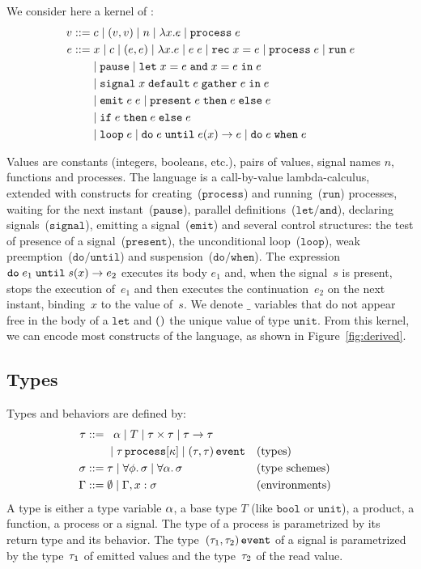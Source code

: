 \documentclass[9pt,preprint]{sigplanconf}
\newcommand{\sdeq}{::=}
\begin{document}
We consider here a kernel of \rml{}:
%
\begin{align*}
v \sdeq &\; c \mid (v, v) \mid n \mid \elam{x}{e} \mid \eproc{e} \\
e \sdeq &\;  x \mid c \mid (e, e) \mid \elam{x}{e} 
  \mid \eapp{e}{e} \mid \erec{x}{e}  \mid \eproc{e} \mid \erun{e} \\
 & \mid \epause{} \mid \eletpar{x}{e}{x}{e}{e} \\
 &\mid \esig{x}{e}{e}{e} \\
 & \mid \eemit{e}{e} \mid \epres{e}{e}{e} \\
 & \mid \eite{e}{e}{e} \\
 &  \mid \eloop{e} \mid \euntil{e}{e}{x}{e} 
   \mid \ewhen{e}{e} 
\end{align*}

Values are constants (integers, booleans, etc.), pairs of values, signal names $n$, functions and processes. The language is a call-by-value lambda-calculus, extended with constructs for creating~($\mathtt{process}$) and running~($\mathtt{run}$) processes, waiting for the next instant~($\mathtt{pause}$), parallel definitions~($\mathtt{let/and}$), declaring signals~($\mathtt{signal}$), emitting a signal~($\mathtt{emit}$) and several control structures: the test of presence of a signal~($\mathtt{present}$), the unconditional loop~($\mathtt{loop}$), weak preemption~($\mathtt{do/until}$) and suspension~($\mathtt{do/when}$).  The expression $\mathtt{do}\; e_1 \;\mathtt{until}\; s(x) \rightarrow e_2$ executes its body $e_1$ and, when the signal~$s$ is present, stops the execution of~$e_1$ and then executes the continuation~$e_2$ on the next instant, binding~$x$ to the value of~$s$. We denote $\_$ variables that do not appear free in the body of a $\mathtt{let}$ and $\mathtt{()}{}$ the unique value of type $\mathtt{unit}$. From this kernel, we can encode most constructs of the language, as shown in Figure~\ref{fig:derived}.

\subsection{Types}

Types and behaviors are defined by:
\begin{align*}
\rt \sdeq &\;\;\; \rtvar \mid T \mid \rtprod{\rt}{\rt} \mid \rtarrow{\rt}{\rt} \\
    &\;\mid \rtproc{\rt}{\rk} \mid \rtsig{\rt}{\rt} && \text{(types)} \\
\rs \sdeq &\; \rt \mid \forall \effvar.\, \rs \mid \forall \rtvar.\, \rs && \text{(type schemes)} \\
\tyenv \sdeq&\; \emptyset \mid \tyenv \tyconcat x : \rs && \text{(environments)}
\end{align*}
A type is either a type variable $\alpha$, a base type $T$ (like $\mathtt{bool}$ or $\mathtt{unit}$), a product, a function, a process or a signal. The type of a process is parametrized by its return type and its behavior. The type~$(\tau_1, \tau_2) \,\mathtt{event}$ of a signal is parametrized by the type~$\tau_1$ of emitted values and the type~$\tau_2$ of the read value.
\end{document}
